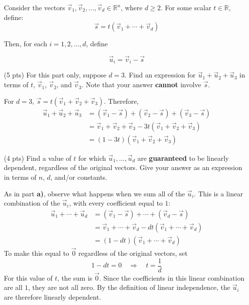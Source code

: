\documentclass[11pt,twoside]{article}
\begin{document}
\medskip








\begin{prob}[(11 pts)]
Consider the vectors $\vec v_1, \vec v_2, \ldots, \vec v_d\in\mathbb R^n$, where $d\geq 2$. For some scalar $t\in\mathbb R$, define:
\[
\vec s=t(\vec v_1+\cdots+\vec v_d)
\]

Then, for each $i=1, 2, \ldots,d$, define

$$\vec u_i = \vec v_i - \vec s$$

\begin{subprob}(5 pts) For this part only, suppose $d=3$. Find an expression for $\vec u_1 + \vec u_2 + \vec u_3$ in terms of $t$, $\vec v_1$, $\vec v_2$, and $\vec v_3$. Note that your answer \textbf{cannot} involve $\vec s$.
\par\medskip

\begin{solution}
For $d=3$, $\vec s=t(\vec v_1+\vec v_2+\vec v_3)$. Therefore,
\begin{align*}
\vec u_1+\vec u_2+\vec u_3
&=(\vec v_1-\vec s)+(\vec v_2-\vec s)+(\vec v_3-\vec s)\\
&=\vec v_1+\vec v_2+\vec v_3-3t(\vec v_1+\vec v_2+\vec v_3)\\
&=\boxed{(1-3t)(\vec v_1+\vec v_2+\vec v_3)}
\end{align*}
\end{solution}
\end{subprob}

\begin{subprob}(4 pts) Find a value of $t$ for which $\vec u_1,\ldots,\vec u_d$ are \textbf{guaranteed} to be linearly dependent, regardless of the original vectors. Give your answer as an expression in terms of $n$, $d$, and/or constants.
\par\medskip

\begin{solution}
As in part \textbf{a)}, observe what happens when we sum all of the $\vec u_i$. This is a linear combination of the $\vec u_i$, with every coefficient equal to $1$:
\begin{align*}
\vec u_1+\cdots+\vec u_d
&=(\vec v_1-\vec s)+\cdots+(\vec v_d-\vec s)\\
&=\vec v_1+\cdots+\vec v_d-dt(\vec v_1+\cdots+\vec v_d)\\
&=(1-dt)(\vec v_1+\cdots+\vec v_d)
\end{align*}
To make this equal to $\vec0$ regardless of the original vectors, set
\[
1-dt=0
\quad\Longrightarrow\quad
\boxed{t=\frac1d}
\]
For this value of $t$, the sum is $\vec0$. Since the coefficients in this linear combination are all $1$, they are not all zero. By the definition of linear independence, the $\vec u_i$ are therefore linearly dependent.
\end{solution}
\end{subprob}


\end{prob}
\end{document}
